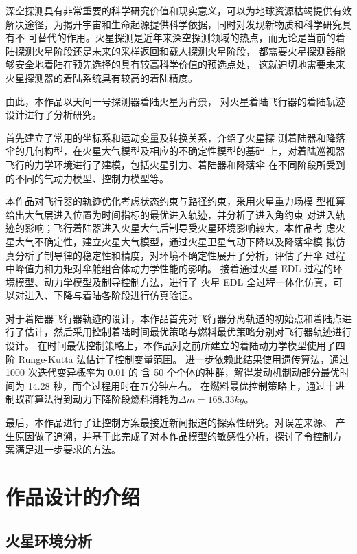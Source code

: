 \documentclass[UTF8,12pt]{ctexart}
\begin{document}
深空探测具有非常重要的科学研究价值和现实意义，可以为地球资源枯竭提供有效
解决途径，为揭开宇宙和生命起源提供科学依据，同时对发现新物质和科学研究具有不
可替代的作用。火星探测是近年来深空探测领域的热点，而无论是当前的着陆探测火星阶段还是未来的采样返回和载人探测火星阶段，
都需要火星探测器能够安全地着陆在预先选择的具有较高科学价值的预选点处，
这就迫切地需要未来火星探测器的着陆系统具有较高的着陆精度。

由此，本作品以天问一号探测器着陆火星为背景，
对火星着陆飞行器的着陆轨迹设计进行了分析研究。

首先建立了常用的坐标系和运动变量及转换关系，介绍了火星探
测着陆器和降落伞的几何构型，在火星大气模型及相应的不确定性模型的基础
上，对着陆巡视器飞行的力学环境进行了建模，包括火星引力、着陆器和降落伞
在不同阶段所受到的不同的气动力模型、控制力模型等。

本作品对飞行器的轨迹优化考虑状态约束与路径约束，采用火星重力场模
型推算给出大气层进入位置为时间指标的最优进入轨迹，并分析了进入角约束
对进入轨迹的影响；飞行着陆器进入火星大气后制导受火星环境影响较大，本作品考
虑火星大气不确定性，建立火星大气模型，通过火星卫星气动下降以及降落伞模
拟仿真分析了制导律的稳定性和精度，对环境不确定性展开了分析，评估了开伞
过程中峰值力和力矩对伞舱组合体动力学性能的影响。
接着通过火星 EDL 过程的环境模型、动力学模型及制导控制方法，进行了
火星 EDL 全过程一体化仿真，可以对进入、下降与着陆各阶段进行仿真验证。

对于着陆器飞行器轨迹的设计，本作品首先对飞行器分离轨道的初始点和着陆点进行了估计，然后采用控制着陆时间最优策略与燃料最优策略分别对飞行器轨迹进行设计。
在时间最优控制策略上，本作品对之前所建立的着陆动力学模型使用了四阶 Runge-Kutta 法估计了控制变量范围。
进一步依赖此结果使用遗传算法，通过 1000 次迭代变异概率为 0.01 的
含 50 个个体的种群，解得发动机制动部分最优时间为 14.28 秒，而全过程用时在五分钟左右。
在燃料最优控制策略上，通过十进制蚁群算法得到动力下降阶段燃料消耗为$\Delta m=168.33kg$。

最后，本作品进行了让控制方案最接近新闻报道的探索性研究。对误差来源、
产生原因做了追溯，并基于此完成了对本作品模型的敏感性分析，探讨了令控制方
案满足进一步要求的方法。		
	\section{作品设计的介绍}
	\subsection{火星环境分析}
\end{document}
